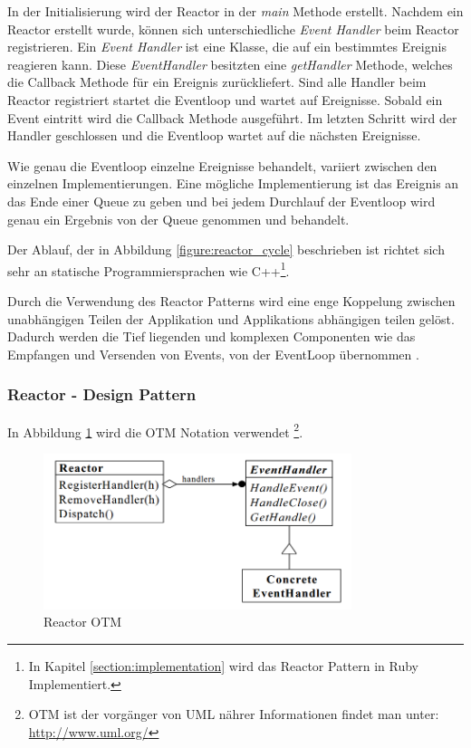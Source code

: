 In der Initialisierung wird der Reactor in der \emph{main} Methode erstellt. Nachdem ein Reactor erstellt wurde, können sich unterschiedliche \emph{Event Handler} beim Reactor registrieren. Ein \emph{Event Handler} ist eine Klasse, die auf ein bestimmtes Ereignis reagieren kann. Diese \emph{EventHandler} besitzten eine \emph{getHandler} Methode, welches die Callback Methode für ein Ereignis zurückliefert. Sind alle Handler beim Reactor registriert startet die Eventloop und wartet auf Ereignisse. Sobald ein Event eintritt wird die Callback Methode ausgeführt. Im letzten Schritt wird der Handler geschlossen und die Eventloop wartet auf die nächsten Ereignisse. 

Wie genau die Eventloop einzelne Ereignisse behandelt, variiert zwischen den einzelnen Implementierungen. Eine mögliche Implementierung ist das Ereignis an das Ende einer Queue zu geben und bei jedem Durchlauf der Eventloop wird genau ein Ergebnis von der Queue genommen und behandelt.

Der Ablauf, der in Abbildung \ref{figure:reactor_cycle} beschrieben ist richtet sich sehr an statische Programmiersprachen wie C++\footnote{In Kapitel \ref{section:implementation} wird das Reactor Pattern in Ruby Implementiert.}.

Durch die Verwendung des Reactor Patterns wird eine enge Koppelung zwischen unabhängigen Teilen der Applikation und Applikations abhängigen teilen gelöst. Dadurch werden die Tief liegenden und komplexen Componenten wie das Empfangen und Versenden von Events, von der EventLoop übernommen \cite[p. 2]{Sch95}.

\subsubsection{Reactor - Design Pattern}

In Abbildung \ref{figure:reactor_otm} wird die OTM Notation verwendet \footnote[0]{OTM ist der vorgänger von UML nährer Informationen findet man unter: \url{http://www.uml.org/}}.

\begin{figure}[!htb]
  \centering
  \includegraphics[width=9cm]{images/reactor_otm.png}
  \caption{
    Reactor OTM \cite[p. 4]{Sch95}
  }
  \label{figure:reactor_otm}
\end{figure}

